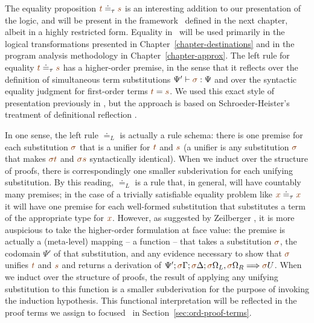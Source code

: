 The equality proposition $\lf{t} \doteq_\tau \lf{s}$ is an interesting
addition to our presentation of the logic, and will be present in the
framework \sls~defined in the next chapter, albeit in a highly
restricted form. Equality in \sls~will be used primarily in the
logical transformations presented in Chapter~\ref{chapter-destinations} 
and in the program
analysis methodology in Chapter~\ref{chapter-approx}. 
The left rule for equality $\lf{t}
\doteq_\tau \lf{s}$ has a higher-order premise, in the sense that it
reflects over the definition of simultaneous term substitutions $\Psi'
\vdash \lf{\sigma} : \Psi$ and over the syntactic equality judgment
for first-order terms $\lf{t} = \lf{s}$.  We used this exact style of
presentation previously in \cite{simmons11weak}, but the approach is
based on Schroeder-Heister's treatment of definitional reflection
\cite{schroeder93rules}.

In one sense, the left rule $\doteq_L$ is actually a rule schema:
there is one premise for each substitution $\lf\sigma$ that is a
unifier for $\lf{t}$ and $\lf{s}$ (a unifier is any substitution
$\lf\sigma$ that makes $\lf{\sigma t}$ and $\lf{\sigma s}$
syntactically identical). When we induct over the structure of proofs,
there is correspondingly one smaller subderivation for each unifying
substitution.  By this reading, $\doteq_L$ is a rule that, in general,
will have countably many premises; in the case of a trivially
satisfiable equality problem like $\lf{x} \doteq_\tau \lf{x}$ it will have
one premise for each well-formed substitution that substitutes a term
of the appropriate type for $\lf{x}$.  However, as suggested by
Zeilberger \cite{zeilberger08focusing}, it is more auspicious to take
the higher-order formulation at face value: the premise is actually a
(meta-level) mapping -- a function -- that takes a substitution
$\lf{\sigma}$, the codomain $\Psi'$ of that substitution, and any
evidence necessary to show that $\lf{\sigma}$ unifies $\lf{t}$ and
$\lf{s}$ and returns a derivation of
$\ofirstseq{\Psi'}{\lf{\sigma}\Gamma}{\lf{\sigma}\Delta}{\lf{\sigma}\Omega_L,\lf{\sigma}\Omega_R}{\lf{\sigma}
  U}$. When we induct over the structure of proofs, the result of
applying any unifying substitution to this function is a smaller
subderivation for the purpose of invoking the induction
hypothesis. This functional interpretation will be reflected in the
proof terms we assign to focused \ollll~in
Section~\ref{sec:ord-proof-terms}.



